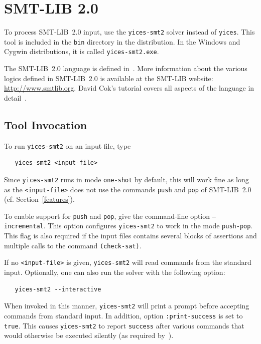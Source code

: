 \documentclass[11pt,twoside,fleqn,openright,titlepage]{cslreport}
\begin{document}
\section{SMT-LIB 2.0}

To process SMT-LIB~2.0 input, use the \texttt{yices-smt2} solver
instead of \texttt{yices}. This tool is included in the \texttt{bin}
directory in the distribution. In the Windows and Cygwin
distributions, it is called \texttt{yices-smt2.exe}.

\medskip\noindent
The SMT-LIB~2.0 language is defined in~\cite{SMTLIB20:2012}. More
information about the various logics defined in SMT-LIB~2.0 is
available at the SMT-LIB website: \url{http://www.smtlib.org}. David Cok's
tutorial covers all aspects of the language in
detail~\cite{SMTLIB:tutorial:2013}.


\subsection{Tool Invocation}

To run \texttt{yices-smt2} on an input file, type
\begin{small}
\begin{verbatim}
   yices-smt2 <input-file>
\end{verbatim}
\end{small}
Since \texttt{yices-smt2} runs in mode \texttt{one-shot} by default,
this will work fine as long as the \texttt{<input-file>} does not use
the commands \texttt{push} and \texttt{pop} of SMT-LIB~2.0
(cf. Section~\ref{features}).

\medskip\noindent To enable support for \texttt{push} and
\texttt{pop}, give the command-line option \texttt{--incremental}.
This option configures \texttt{yices-smt2} to work in the mode
\texttt{push-pop}. This flag is also required if the input files
contains several blocks of assertions and multiple calls to the
command \texttt{(check-sat)}.

\medskip\noindent If no \texttt{<input-file>} is given,
\texttt{yices-smt2} will read commands from the standard
input. Optionally, one can also run the solver with
the following option:
\begin{small}
\begin{verbatim}
   yices-smt2 --interactive
\end{verbatim}
\end{small}
When invoked in this manner, \texttt{yices-smt2} will print a prompt
before accepting commands from standard input. In addition, option
\texttt{:print-success} is set to \texttt{true}. This causes
\texttt{yices-smt2} to report \texttt{success} after various commands
that would otherwise be executed silently (as required
by~\cite{SMTLIB20:2012}).
\end{document}
